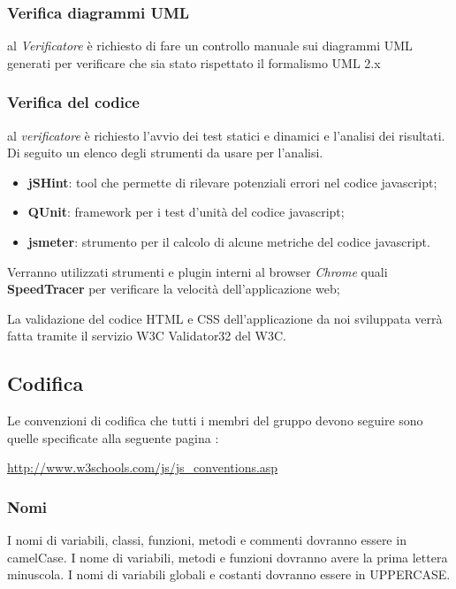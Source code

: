 {	\subsubsection{Verifica diagrammi UML}
	al \emph{Verificatore} è richiesto di fare un controllo manuale sui diagrammi UML generati per verificare che sia stato rispettato il formalismo UML 2.x
	\subsubsection{Verifica del codice}
	al \emph{verificatore} è richiesto l’avvio dei test statici e dinamici e l’analisi dei risultati. Di seguito un elenco degli strumenti da usare per l’analisi.
	
	
	  \begin{itemize}
	  \item \textbf{jSHint}: tool che permette di rilevare potenziali errori nel codice javascript;
	  \item \textbf{QUnit}: framework per i test d'unità del codice javascript;
	  \item \textbf{jsmeter}: strumento per il calcolo di alcune metriche del codice javascript.
	  \end{itemize}
	
	Verranno utilizzati strumenti e plugin interni al browser \emph{Chrome} quali \textbf{SpeedTracer} per verificare la velocità dell'applicazione web;
	
	
	
	La validazione del codice HTML e CSS dell’applicazione da noi sviluppata verrà
	fatta tramite il servizio W3C Validator32 del W3C.
	
	\subsection{Codifica}
	Le convenzioni di codifica che tutti i membri del gruppo devono seguire sono quelle
	specificate alla seguente pagina :\\
	\begin{center} \url{http://www.w3schools.com/js/js_conventions.asp} \end{center}
	\subsubsection{Nomi}
	I nomi di variabili, classi, funzioni, metodi e commenti dovranno essere in camelCase. I nome di variabili, metodi e funzioni dovranno avere la prima lettera	minuscola.
	I nomi di variabili globali e costanti dovranno essere in UPPERCASE.
}

